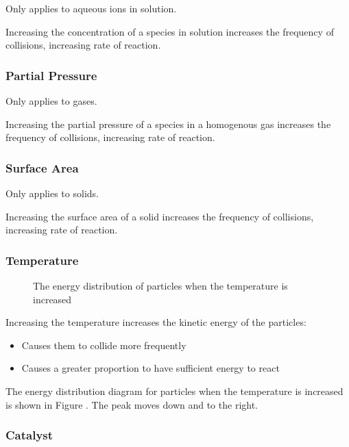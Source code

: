 \documentclass[a4paper,11pt]{article}
\begin{document}
Only applies to aqueous ions in solution.

Increasing the concentration of a species in solution increases the frequency
of collisions, increasing rate of reaction.


\subsubsection{Partial Pressure}

Only applies to gases.

Increasing the partial pressure of a species in a homogenous gas increases the
frequency of collisions, increasing rate of reaction.


\subsubsection{Surface Area}

Only applies to solids.

Increasing the surface area of a solid increases the frequency of collisions,
increasing rate of reaction.


\subsubsection{Temperature}

\begin{figure}
\begin{center}
\caption{The energy distribution of particles when the temperature is increased}
\label{fig:temperature-distribution}
\end{center}
\end{figure}

Increasing the temperature increases the kinetic energy of the particles:

\begin{itemize}
\item Causes them to collide more frequently
\item Causes a greater proportion to have sufficient energy to react
\end{itemize}

The energy distribution diagram for particles when the temperature is increased
is shown in Figure \label{fig:temperature-distribution}. The peak moves down
and to the right.


\subsubsection{Catalyst}
\end{document}
